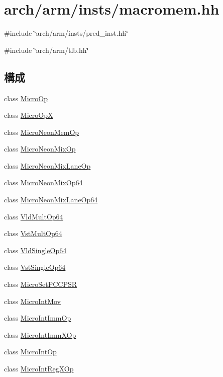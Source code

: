 \hypertarget{macromem_8hh}{
\section{arch/arm/insts/macromem.hh}
\label{macromem_8hh}
}
{\ttfamily \#include \char`\"{}arch/arm/insts/pred\_\-inst.hh\char`\"{}}\par
{\ttfamily \#include \char`\"{}arch/arm/tlb.hh\char`\"{}}\par
\subsection*{構成}
\begin{DoxyCompactItemize}
\item 
class \hyperlink{classArmISA_1_1MicroOp}{MicroOp}
\item 
class \hyperlink{classArmISA_1_1MicroOpX}{MicroOpX}
\item 
class \hyperlink{classArmISA_1_1MicroNeonMemOp}{MicroNeonMemOp}
\item 
class \hyperlink{classArmISA_1_1MicroNeonMixOp}{MicroNeonMixOp}
\item 
class \hyperlink{classArmISA_1_1MicroNeonMixLaneOp}{MicroNeonMixLaneOp}
\item 
class \hyperlink{classArmISA_1_1MicroNeonMixOp64}{MicroNeonMixOp64}
\item 
class \hyperlink{classArmISA_1_1MicroNeonMixLaneOp64}{MicroNeonMixLaneOp64}
\item 
class \hyperlink{classArmISA_1_1VldMultOp64}{VldMultOp64}
\item 
class \hyperlink{classArmISA_1_1VstMultOp64}{VstMultOp64}
\item 
class \hyperlink{classArmISA_1_1VldSingleOp64}{VldSingleOp64}
\item 
class \hyperlink{classArmISA_1_1VstSingleOp64}{VstSingleOp64}
\item 
class \hyperlink{classArmISA_1_1MicroSetPCCPSR}{MicroSetPCCPSR}
\item 
class \hyperlink{classArmISA_1_1MicroIntMov}{MicroIntMov}
\item 
class \hyperlink{classArmISA_1_1MicroIntImmOp}{MicroIntImmOp}
\item 
class \hyperlink{classArmISA_1_1MicroIntImmXOp}{MicroIntImmXOp}
\item 
class \hyperlink{classArmISA_1_1MicroIntOp}{MicroIntOp}
\item 
class \hyperlink{classArmISA_1_1MicroIntRegXOp}{MicroIntRegXOp}

\end{DoxyCompactItemize}
